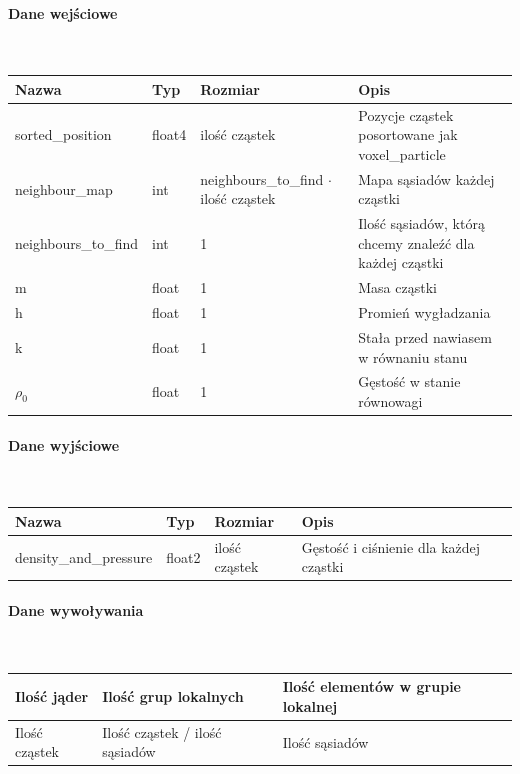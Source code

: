 \documentclass[polish, 12pt]{aghthesis}
\begin{document}
				\paragraph{Dane wejściowe} \ \\
					\begin{tabular}{| p{} | p{} | p{} | p{} |}
					\hline
						Nazwa & Typ & Rozmiar & Opis \\
					\hline
						sorted\_position & float4 & ilość cząstek & Pozycje cząstek posortowane jak voxel\_particle\\
					\hline
						neighbour\_map & int & neighbours\_to\_find ${\cdot}$ ilość cząstek & Mapa sąsiadów każdej cząstki\\
					\hline
						neighbours\_to\_find & int & 1 & Ilość sąsiadów, którą chcemy znaleźć dla każdej cząstki \\ 
					\hline
						m & float & 1 & Masa cząstki \\ 
					\hline
						h & float & 1 & Promień wygładzania \\ 
					\hline
						k & float & 1 & Stała przed nawiasem w równaniu stanu \\ 
					\hline
						${\rho_0}$ & float & 1 & Gęstość w stanie równowagi \\ 
					\hline	
				\end{tabular}
				\paragraph{Dane wyjściowe} \ \\
					\begin{tabular}{| p{} | p{} | p{} | p{} |}
					\hline
						Nazwa & Typ & Rozmiar & Opis \\
					\hline
						density\_and\_pressure & float2 & ilość cząstek & Gęstość i ciśnienie dla każdej cząstki\\
					\hline
				\end{tabular}
				\paragraph{Dane wywoływania} \ \\
					\begin{tabular}{| p{} | p{} | p{}|}
					\hline
						Ilość jąder & Ilość grup lokalnych & Ilość elementów w grupie lokalnej \\
					\hline
						Ilość cząstek & Ilość cząstek / ilość sąsiadów & Ilość sąsiadów \\ 
					\hline
					\end{tabular}
\end{document}
